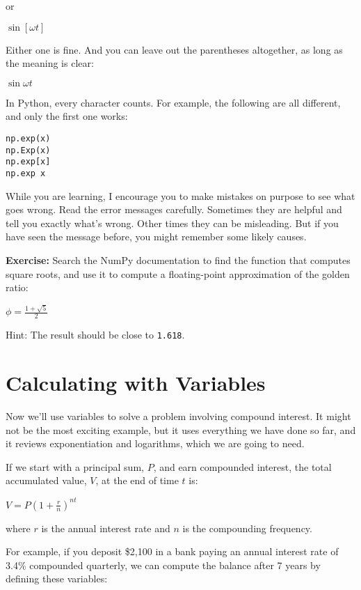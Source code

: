 or

\(\sin [\omega t]\)

Either one is fine. And you can leave out the parentheses altogether, as
long as the meaning is clear:

\(\sin \omega t\)

In Python, every character counts. For example, the following are all
different, and only the first one works:

\begin{lstlisting}[style=output]
np.exp(x)
np.Exp(x)
np.exp[x]
np.exp x
\end{lstlisting}

While you are learning, I encourage you to make mistakes on purpose to
see what goes wrong. Read the error messages carefully. Sometimes they
are helpful and tell you exactly what's wrong. Other times they can be
misleading. But if you have seen the message before, you might remember
some likely causes.

\textbf{Exercise:} Search the NumPy documentation to find the function
that computes square roots, and use it to compute a floating-point
approximation of the golden ratio:

\(\phi = \frac{1 + \sqrt{5}}{2}\)

Hint: The result should be close to \passthrough{\lstinline!1.618!}.

\hypertarget{calculating-with-variables}{%
\section{Calculating with Variables}\label{calculating-with-variables}}

Now we'll use variables to solve a problem involving compound interest.
It might not be the most exciting example, but it uses everything we
have done so far, and it reviews exponentiation and logarithms, which we
are going to need.

If we start with a principal sum, \(P\), and earn compounded interest,
the total accumulated value, \(V\), at the end of time \(t\) is:

\(V=P\left(1+{\frac {r}{n}}\right)^{nt}\)

where \(r\) is the annual interest rate and \(n\) is the compounding
frequency.

For example, if you deposit \$2,100 in a bank paying an annual interest
rate of 3.4\% compounded quarterly, we can compute the balance after 7
years by defining these variables:

